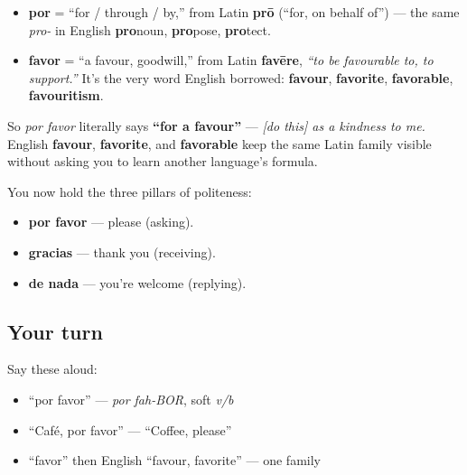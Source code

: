 \begin{cousinweb}
\begin{itemize}
\raggedright
  \item \textbf{por} = \textquotedblleft{}for / through / by,\textquotedblright{} from Latin \textbf{prō} (\textquotedblleft{}for, on behalf of\textquotedblright{}) — the same \emph{pro-} in English \textbf{pro}noun, \textbf{pro}pose, \textbf{pro}tect.
  \item \textbf{favor} = \textquotedblleft{}a favour, goodwill,\textquotedblright{} from Latin \textbf{favēre}, \emph{\textquotedblleft{}to be favourable to, to support.\textquotedblright{}} It's the very word English borrowed: \textbf{favour}, \textbf{favorite}, \textbf{favorable}, \textbf{favouritism}.
\end{itemize}

So \emph{por favor} literally says \textbf{“for a favour”} — \emph{{[}do this{]} as a kindness to me.} English \textbf{favour}, \textbf{favorite}, and \textbf{favorable} keep the same Latin family visible without asking you to learn another language's formula.
\end{cousinweb}

\begin{grammarlens}[title={Grammar Lens: the courtesy set is complete}]
You now hold the three pillars of politeness:

\begin{itemize}
\raggedright
  \item \textbf{por favor} — please (asking).
  \item \textbf{gracias} — thank you (receiving).
  \item \textbf{de nada} — you're welcome (replying).
\end{itemize}
\end{grammarlens}

\subsection*{Your turn}
Say these aloud:

\begin{itemize}
\raggedright
  \item \textquotedblleft{}por favor\textquotedblright{} — \emph{por fah-BOR}, soft \emph{v/b}
  \item \textquotedblleft{}Café, por favor\textquotedblright{} — \textquotedblleft{}Coffee, please\textquotedblright{}
  \item \textquotedblleft{}favor\textquotedblright{} then English \textquotedblleft{}favour, favorite\textquotedblright{} — one family
\end{itemize}

